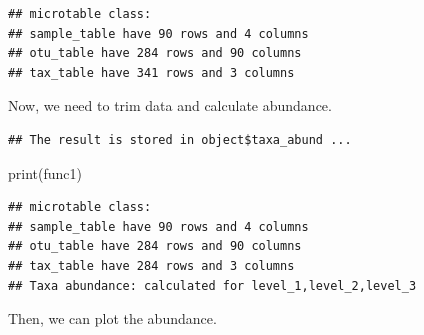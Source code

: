 \documentclass[
]{book}
\newenvironment{Shaded}{\begin{snugshade}}{\end{snugshade}}
\newcommand{\AttributeTok}[1]{\textcolor[rgb]{0.77,0.63,0.00}{#1}}
\newcommand{\CommentTok}[1]{\textcolor[rgb]{0.56,0.35,0.01}{\textit{#1}}}
\newcommand{\ConstantTok}[1]{\textcolor[rgb]{0.00,0.00,0.00}{#1}}
\newcommand{\FunctionTok}[1]{\textcolor[rgb]{0.00,0.00,0.00}{#1}}
\newcommand{\NormalTok}[1]{#1}
\newcommand{\OtherTok}[1]{\textcolor[rgb]{0.56,0.35,0.01}{#1}}
\newcommand{\SpecialCharTok}[1]{\textcolor[rgb]{0.00,0.00,0.00}{#1}}
\newcommand{\StringTok}[1]{\textcolor[rgb]{0.31,0.60,0.02}{#1}}
\begin{document}
\begin{verbatim}
## microtable class:
## sample_table have 90 rows and 4 columns
## otu_table have 284 rows and 90 columns
## tax_table have 341 rows and 3 columns
\end{verbatim}

Now, we need to trim data and calculate abundance.

\begin{Shaded}
\end{Shaded}

\begin{verbatim}
## The result is stored in object$taxa_abund ...
\end{verbatim}

\begin{Shaded}
\begin{Highlighting}[]
\FunctionTok{print}\NormalTok{(func1)}
\end{Highlighting}
\end{Shaded}

\begin{verbatim}
## microtable class:
## sample_table have 90 rows and 4 columns
## otu_table have 284 rows and 90 columns
## tax_table have 284 rows and 3 columns
## Taxa abundance: calculated for level_1,level_2,level_3
\end{verbatim}

Then, we can plot the abundance.

\begin{Shaded}
\end{Shaded}
\end{document}
